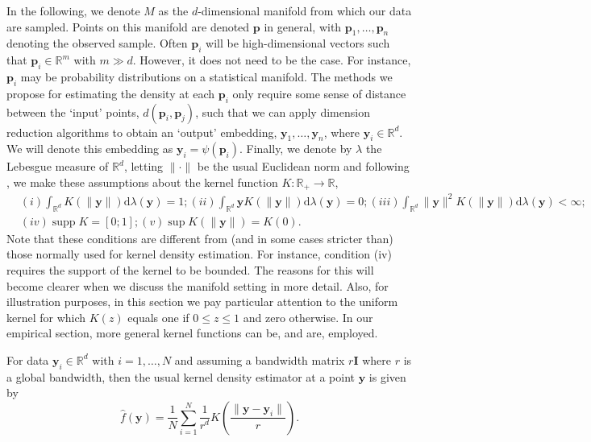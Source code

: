 \documentclass[11pt,a4paper,]{article}
\DeclareMathOperator\supp{supp}
\begin{document}
In the following, we denote \(M\) as the \(d\)-dimensional manifold from which our data are sampled. Points on this manifold are denoted \(\pmb{p}\) in general, with \(\pmb{p}_1,\dots,\pmb{p}_n\) denoting the observed sample. Often \(\pmb{p}_i\) will be high-dimensional vectors such that \(\pmb{p}_i\in\mathbb{R}^m\) with \(m\gg d\). However, it does not need to be the case. For instance, \(\pmb{p}_i\) may be probability distributions on a statistical manifold. The methods we propose for estimating the density at each \(\pmb{p}_i\) only require some sense of distance between the `input' points, \(d(\pmb{p}_i,\pmb{p}_j)\), such that we can apply dimension reduction algorithms to obtain an `output' embedding, \(\pmb{y}_1,\dots,\pmb{y}_n\), where \(\pmb{y}_i\in\mathbb{R}^d\). We will denote this embedding as \(\pmb{y}_i=\psi(\pmb{p}_i)\). Finally, we denote by \(\lambda\) the Lebesgue measure of \(\mathbb{R}^d\), letting \(\|\cdot\|\) be the usual Euclidean norm and following \textcite{Pelletier2005-vu}, we make these assumptions about the kernel function \(K:\mathbb{R}_+\rightarrow\mathbb{R}\),
\begin{align}
\label{eq:kernelcondition}
& (i) \int_{\mathbb{R}^{d}} K(\|\pmb{y}\|) \mathrm{d} \lambda(\pmb{y})=1;
(ii) \int_{\mathbb{R}^{d}} \pmb{y} K(\|\pmb{y}\|) \mathrm{d} \lambda(\pmb{y})=0;
(iii) \int_{\mathbb{R}^{d}}\|\pmb{y}\|^{2} K(\|\pmb{y}\|) \mathrm{d} \lambda(\pmb{y})<\infty; \\
& (iv) \supp K=[0; 1];
(v) \sup K(\|\pmb{y}\|)=K(0).
\end{align}
Note that these conditions are different from (and in some cases stricter than) those normally used for kernel density estimation. For instance, condition (iv) requires the support of the kernel to be bounded. The reasons for this will become clearer when we discuss the manifold setting in more detail. Also, for illustration purposes, in this section we pay particular attention to the uniform kernel for which \(K(z)\) equals one if \(0\leq z\leq1\) and zero otherwise. In our empirical section, more general kernel functions can be, and are, employed.

For data \(\pmb{y}_i\in\mathbb{R}^d\) with \(i=1,\dots,N\) and assuming a bandwidth matrix \(r\pmb{I}\) where \(r\) is a global bandwidth, then the usual kernel density estimator at a point \(\pmb{y}\) is given by
\begin{equation}
\label{eq:vkde}
\hat{f}(\pmb{y})=\frac{1}{N}\sum\limits_{i=1}^N \frac{1}{r^d} K\left(\frac{\|\pmb{y}-\pmb{y}_i\|}{r}\right).
\end{equation}
\end{document}
